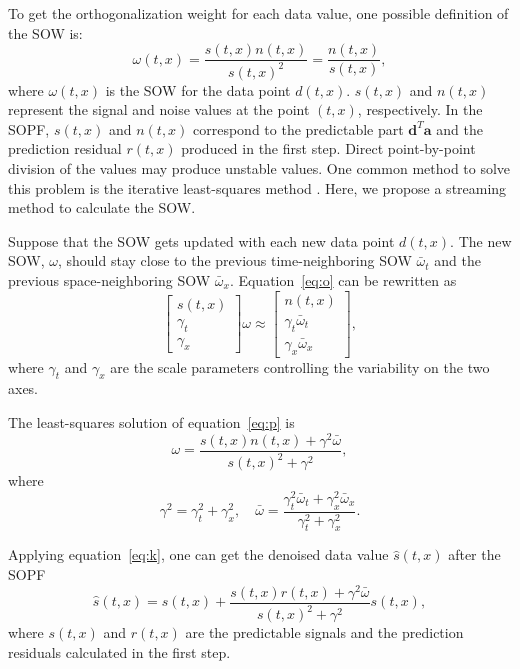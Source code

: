 To get the orthogonalization weight for each data value, one
possible definition of the SOW is:
 \begin{equation}
  \label{eq:o}
\omega(t,x)=\frac{s(t,x)n(t,x)}{s(t,x)^2}=\frac{n(t,x)}{s(t,x)},
\end{equation}
where $\omega(t,x)$ is the SOW for the data point $d(t,x)$. $s(t,x)$
and $n(t,x)$ represent the signal and noise values at the point
$(t,x)$, respectively. In the SOPF, $s(t,x)$ and $n(t,x)$
correspond to the predictable part $\mathbf{d}^T\mathbf{a}$ and the
prediction residual $r(t,x)$ produced in the first step. Direct
point-by-point division of the values may produce 
unstable values. One common method to solve this problem is the
iterative least-squares method
\cite[]{Chen15}. Here, we propose a streaming method to calculate the SOW.

Suppose that the SOW gets updated with each new data point
$d(t,x)$. The new SOW, $\omega$, should stay close to the previous
time-neighboring SOW $\bar{\omega}_t$ and the previous
space-neighboring SOW $\bar{\omega}_x$. Equation~\ref{eq:o} can be
rewritten as
\begin{equation}
  \label{eq:p}
\left[ \begin{array}{c}
s(t,x)\\
\gamma_t\\
\gamma_x
\end{array}\right]
\omega \approx
\left[ \begin{array}{c}
n(t,x)\\
\gamma_t\bar{\omega}_t\\
\gamma_x\bar{\omega}_x
\end{array}\right],
\end{equation}
where $\gamma_t$ and $\gamma_x$ are the scale parameters controlling
the variability on the two axes.

The least-squares solution of equation~\ref{eq:p} is
 \begin{equation}
  \label{eq:q}
\omega=\frac{s(t,x)n(t,x)+\gamma^2\bar{\omega}}{s(t,x)^2+\gamma^2},
\end{equation}
where 
\begin{equation}
  \label{eq:r}
\gamma^2=\gamma_t^2+\gamma_x^2,
\quad\bar{\omega}=\frac{\gamma_t^2\bar{\omega}_t+\gamma_x^2\bar{\omega}_x}
{\gamma_t^2+\gamma_x^2}.
\end{equation}

Applying equation~\ref{eq:k}, one can get the denoised data value
$\hat{s}(t,x)$ after the SOPF
\begin{equation}
  \label{eq:s}
\hat{s}(t,x)=s(t,x)+\frac{s(t,x)r(t,x)+\gamma^2\bar{\omega}}
{s(t,x)^2+\gamma^2}s(t,x),
\end{equation}
where $s(t,x)$ and $r(t,x)$ are the predictable signals and the
prediction residuals calculated in the first step.

